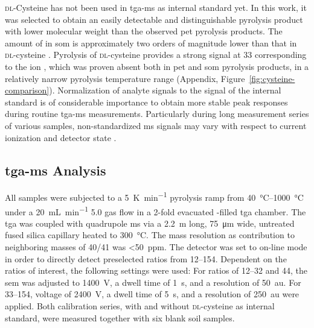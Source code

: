 \textsc{dl}-Cysteine has not been used in \ac{tga-ms} as internal standard yet. In this work, it was selected to obtain an easily detectable and distinguishable pyrolysis product with lower molecular weight than the observed \ac{pet} pyrolysis products. The amount of  in \ac{som} is approximately two orders of magnitude lower than that in \textsc{dl}-cysteine \citep{BlumeScheffer2016}. Pyrolysis of \textsc{dl}-cysteine provides a strong signal at \SI{33}{\mz} corresponding to the  ion \citep{ChoiDetermination1995}, which was proven absent both in \ac{pet} and \ac{som} pyrolysis products, in a relatively narrow pyrolysis temperature range (Appendix, Figure~\ref{fig:cysteine-comparison}).
Normalization of analyte signals to the signal of the internal standard is of considerable importance to obtain more stable peak responses during routine \ac{tga-ms} measurements. Particularly during long measurement series of various samples, non-standardized \ac{ms} signals may vary with respect to current ionization and detector state \citep{NetzschGeratebauMS2010}.

\subsection{\Acs{tga-ms} Analysis}\label{sec:tga-ms-analysis}

All samples were subjected to a \SI{5}{\kelvin\per\minute} pyrolysis ramp from \SIrange[range-phrase = { to }]{40}{1000}{\degreeCelsius} under a \SI{20}{\milli\liter\per\minute}  5.0 gas flow in a \num{2}-fold evacuated -filled \ac{tga} chamber. The \ac{tga} was coupled with  quadrupole \ac{ms} via a \SI{2.2}{\meter} long, \SI{75}{\micro\meter} wide, untreated fused silica capillary heated to \SI{300}{\degreeCelsius}.
The mass resolution as contribution to neighboring masses of \num{40}/\num{41} was \SI{<50}{ppm}. The detector was set to on-line mode in order to directly detect preselected \si{\mz} ratios from \numrange[range-phrase = { to }]{12}{154}.
Dependent on the \si{\mz} ratios of interest, the following settings were used: For \si{\mz} ratios of \numrange{12}{32} and \num{44}, the \ac{sem} was adjusted to \SI{1400}{\volt}, a dwell time of \SI{1}{\second}, and a resolution of \SI{50}{au}. For \si{\mz} \numrange{33}{154},  voltage of \SI{2400}{\volt}, a dwell time of \SI{5}{\second}, and a resolution of \SI{250}{au} were applied.
Both calibration series, with and without \textsc{dl}-cysteine as internal standard, were measured together with six blank soil samples.

